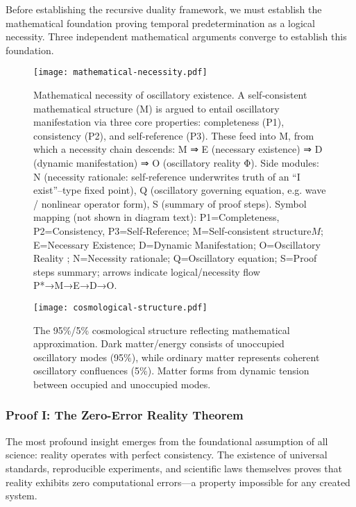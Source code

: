 \documentclass[12pt,a4paper]{article}
\begin{document}
Before establishing the recursive duality framework, we must establish the mathematical foundation proving temporal predetermination as a logical necessity. Three independent mathematical arguments converge to establish this foundation.

\begin{figure}[h]
\centering
\texttt{[image: mathematical-necessity.pdf]}
\caption{Mathematical necessity of oscillatory existence. A self‑consistent mathematical structure (M) is argued to entail oscillatory manifestation via three core properties: completeness (P1), consistency (P2), and self‑reference (P3). These feed into M, from which a necessity chain descends: M ⇒ E (necessary existence) ⇒ D (dynamic manifestation) ⇒ O (oscillatory reality Φ). Side modules: N (necessity rationale: self‑reference underwrites truth of an “I exist”–type fixed point), Q (oscillatory governing equation, e.g. wave / nonlinear operator form), S (summary of proof steps). Symbol mapping (not shown in diagram text): P1=Completeness, P2=Consistency, P3=Self‑Reference; M=Self‑consistent structure$M$; E=Necessary Existence; D=Dynamic Manifestation; O=Oscillatory Reality \phi; N=Necessity rationale; Q=Oscillatory equation; S=Proof steps summary; arrows indicate logical/necessity flow P*→M→E→D→O.}
\label{fig:mathematical-necessity}
\end{figure}

\begin{figure}[h]
\centering
\texttt{[image: cosmological-structure.pdf]}
\caption{The 95\%/5\% cosmological structure reflecting mathematical approximation. Dark matter/energy consists of unoccupied oscillatory modes (95\%), while ordinary matter represents coherent oscillatory confluences (5\%). Matter forms from dynamic tension between occupied and unoccupied modes.}
\label{fig:cosmological-structure}
\end{figure}

\subsubsection{Proof I: The Zero-Error Reality Theorem}

The most profound insight emerges from the foundational assumption of all science: reality operates with perfect consistency. The existence of universal standards, reproducible experiments, and scientific laws themselves proves that reality exhibits zero computational errors—a property impossible for any created system.
\end{document}
